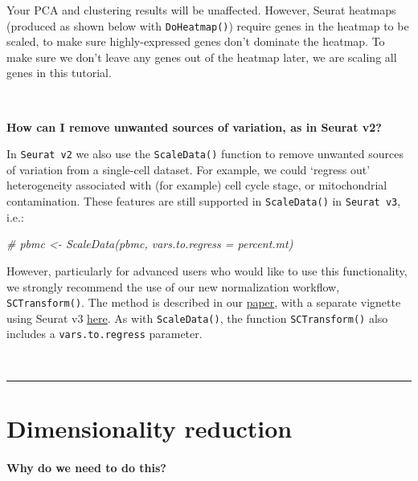 \documentclass[
]{book}
\newenvironment{Shaded}{\begin{snugshade}}{\end{snugshade}}
\newcommand{\CommentTok}[1]{\textcolor[rgb]{0.56,0.35,0.01}{\textit{#1}}}
\begin{document}
Your PCA and clustering results will be unaffected. However, Seurat heatmaps (produced as shown below with \texttt{DoHeatmap()}) require genes in the heatmap to be scaled, to make sure highly-expressed genes don't dominate the heatmap. To make sure we don't leave any genes out of the heatmap later, we are scaling all genes in this tutorial.

~

\textbf{How can I remove unwanted sources of variation, as in Seurat v2?}

In \texttt{Seurat\ v2} we also use the \texttt{ScaleData()} function to remove unwanted sources of variation from a single-cell dataset. For example, we could `regress out' heterogeneity associated with (for example) cell cycle stage, or mitochondrial contamination. These features are still supported in \texttt{ScaleData()} in \texttt{Seurat\ v3}, i.e.:

\begin{Shaded}
\begin{Highlighting}[]
\CommentTok{\# pbmc \textless{}{-} ScaleData(pbmc, vars.to.regress = \textquotesingle{}percent.mt\textquotesingle{})}
\end{Highlighting}
\end{Shaded}

However, particularly for advanced users who would like to use this functionality, we strongly recommend the use of our new normalization workflow, \texttt{SCTransform()}. The method is described in our \href{https://genomebiology.biomedcentral.com/articles/10.1186/s13059-019-1874-1}{paper}, with a separate vignette using Seurat v3 \href{sctransform_vignette.html}{here}. As with \texttt{ScaleData()}, the function \texttt{SCTransform()} also includes a \texttt{vars.to.regress} parameter.

~

\begin{center}\rule{0.5\linewidth}{0.5pt}\end{center}

\hypertarget{dimensionality-reduction}{%
\chapter{Dimensionality reduction}\label{dimensionality-reduction}}

\hypertarget{why-do-we-need-to-do-this-4}{%
\subsubsection*{Why do we need to do this?}\label{why-do-we-need-to-do-this-4}}
\end{document}

